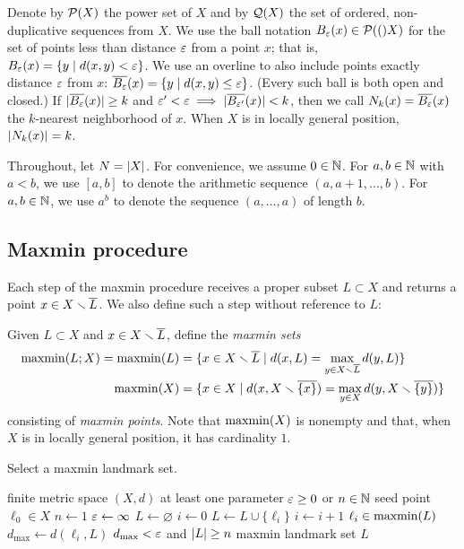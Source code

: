 \documentclass[
]{article}
\begin{document}
Denote by \(\mathcal{P}(X)\) the power set of \(X\) and by \(\mathcal{Q}(X)\) the
set of ordered, non-duplicative sequences from \(X\). We use the ball
notation \(B_{\varepsilon}(x) \in \mathcal{P}(()X)\) for the set of points less than
distance \(\varepsilon\) from a point \(x\); that is,
\(B_{\varepsilon}(x) = \{ y \mid d(x,y) < \varepsilon \}\). We use an overline to also
include points exactly distance \(\varepsilon\) from \(x\):
\(\overline{B_{\varepsilon}}(x) = \{ y \mid d(x,y) \leq \varepsilon \}\). (Every such ball
is both open and closed.) If \(\lvert \overline{B_\varepsilon}(x)\rvert \geq k\) and
\(\varepsilon'<\varepsilon \implies \lvert \overline{B_{\varepsilon'}}(x)\rvert < k\), then we call
\(N_k(x) = \overline{B_\varepsilon}(x)\) the \(k\)-nearest neighborhood of \(x\).
When \(X\) is in locally general position, \(\lvert N_k(x)\rvert = k\).

Throughout, let \(N=\lvert X\rvert\). For convenience, we assume \(0\in\mathbb{N}\).
For \(a,b \in \mathbb{N}\) with \(a<b\), we use \([a,b]\) to denote the
arithmetic sequence \((a,a+1,\ldots,b)\). For \(a,b \in \mathbb{N}\), we use
\(a^b\) to denote the sequence \((a,\ldots,a)\) of length \(b\).

\hypertarget{maxmin-procedure}{%
\subsection{Maxmin procedure}\label{maxmin-procedure}}

\label{sec:maxmin}

Each step of the maxmin procedure receives a proper subset
\(L\subset X\) and returns a point \(x\in X\smallsetminus \overline{L}\). We also define
such a step without reference to \(L\):

Given \(L\subset X\) and \(x\in X\smallsetminus \overline{L}\), define the
\emph{maxmin sets} \begin{align*}
    \operatorname{maxmin}(L;X) = \operatorname{maxmin}(L) &= \{x\in X \smallsetminus \overline{L}\mid d(x,L) = \max_{y\in X\smallsetminus \overline{L}}{d(y,L)}\} \\
    \operatorname{maxmin}(X) &= \{x\in X\mid d(x,X \smallsetminus \overline{\{x\}}) = \max_{y\in X}{d(y,X \smallsetminus \overline{\{y\}})}\}
\end{align*} consisting of \emph{maxmin points}. Note that
\(\operatorname{maxmin}(X)\) is nonempty and that, when \(X\) is in locally general
position, it has cardinality \(1\).

\begin{algorithm}
\caption{Select a maxmin landmark set.}
\label{alg:maxmin}
\begin{algorithmic}[1]
\REQUIRE finite metric space $(X,d)$
\REQUIRE at least one parameter $\varepsilon\geq 0$ or $n\in\mathbb{N}$
\REQUIRE seed point $\ell_0 \in X$
    \STATE $n \leftarrow 1$
\ENDIF
{}
    \STATE $\varepsilon \leftarrow \infty$
\ENDIF
\STATE $L \leftarrow \varnothing$
\STATE $i \leftarrow 0$
\REPEAT
    \STATE $L \leftarrow L\cup\{\ell_i\}$
    \STATE $i \leftarrow i+1$
    \STATE $\ell_i \in \operatorname{maxmin}(L)$
    \STATE $d_{\operatorname{max}} \leftarrow d(\ell_i,L)$
\UNTIL $d_{\operatorname{max}} < \varepsilon$ and $\lvert L\rvert \geq n$
\RETURN maxmin landmark set $L$
\end{algorithmic}
\end{algorithm}
\end{document}
